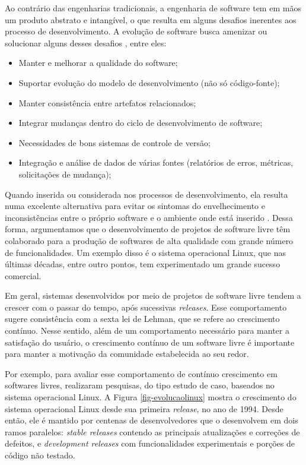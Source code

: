 Ao contrário das engenharias tradicionais, a engenharia de software tem em mãos um produto abstrato e intangível, o que resulta em alguns desafios inerentes aos processo de desenvolvimento. A evolução de software busca amenizar ou solucionar alguns desses desafios \cite{mens2005challenges}, entre eles:

\begin{itemize}
\item Manter e melhorar a qualidade do software;
\item Suportar evolução do modelo de desenvolvimento (não só código-fonte);
\item Manter consistência entre artefatos relacionados;
\item Integrar mudanças dentro do ciclo de desenvolvimento de software;
\item Necessidades de bons sistemas de controle de versão;
\item Integração e análise de dados de várias fontes (relatórios de erros, métricas, solicitações de mudança);
\end{itemize}

Quando inserida ou considerada nos processos de desenvolvimento, ela resulta numa excelente alternativa para evitar os sintomas do envelhecimento e inconsistências entre o próprio software e o ambiente onde está inserido \cite{mens2005challenges}.
Dessa forma, argumentamos que o desenvolvimento de projetos de software livre têm colaborado para a produção de softwares de alta qualidade com grande número de funcionalidades. Um exemplo disso é o sistema operacional Linux, que nas últimas décadas, entre outro pontos, tem experimentado um grande sucesso comercial.

Em geral, sistemas desenvolvidos por meio de projetos de software livre tendem a crescer com o passar do tempo, após sucessivas \textit{releases}. Esse comportamento sugere consistência com a sexta lei de Lehman, que se refere ao crescimento contínuo. Nesse sentido, além de um comportamento necessário para manter a satisfação do usuário, o crescimento contínuo de um software livre é importante para manter a motivação da comunidade estabelecida ao seu redor.

Por exemplo, para avaliar esse comportamento de contínuo crescimento em softwares livres,  realizaram pesquisas, do tipo estudo de caso, baseados no sistema operacional Linux.
%
A Figura \ref{fig-evolucaolinux} mostra o crescimento do sistema operacional Linux desde sua primeira \textit{release}, no ano de 1994. Desde então, ele é mantido por centenas de desenvolvedores que o desenvolvem em dois ramos paralelos: \textit{stable releases} contendo as principais atualizações e correções de defeitos, e \textit{development releases} com funcionalidades experimentais e porções de código não testado.

